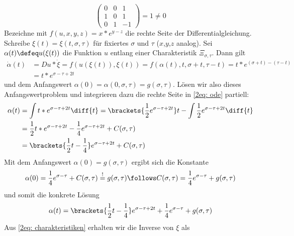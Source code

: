 \begin{exercisePage}[Charakteristikenmethode]
\begin{enumerate}[label=(zu \alph*), leftmargin=*]
\begin{equation*}
\begin{pmatrix}
				0 & 0 & 1 \\ 1 & 0 & 1 \\ 0 & 1 & -1
			\end{pmatrix}
			= 1 \neq 0
		\end{equation*}
		Bezeichne mit $f(u,x,y,z) = x * e^{y-z}$ die rechte Seite der Differentialgleichung. Schreibe $\xi(t) = \xi(t, \sigma, \tau)$ für fixiertes $\sigma$ und $\tau$ ($x$,$y$,$z$ analog). Sei $\alpha(t) \defeq u(\xi(t))$ die Funktion $u$ entlang einer Charakteristik $\Xi_{\sigma, \tau}$. Dann gilt
		\begin{equation} \label{2eq: ode}
			\begin{aligned}
				\dot{\alpha}(t) 
				&= Du * \dot{\xi} = f(u(\xi(t)), \xi(t)) = f(\alpha(t), t, \sigma + t, \tau -t) = t * e^{(\sigma + t) - (\tau - t)} \\
				&= t*e^{\sigma - \tau + 2t}
			\end{aligned}
		\end{equation}
		und dem Anfangswert $\alpha(0) = \alpha(0, \sigma, \tau) = g(\sigma, \tau)$. Lösen wir also dieses Anfangswertproblem und integrieren dazu die rechte Seite in \cref{2eq: ode} partiell:
		\begin{equation*}
			\begin{aligned}
				\alpha(t) 
				&= \int t*e^{\sigma - \tau + 2t} \diff{t} 
				= \brackets{\frac{1}{2} e^{\sigma - \tau + 2t}} t - \int \frac{1}{2} e^{\sigma - \tau + 2t} \diff{t} \\
				&= \frac{1}{2} t * e^{\sigma - \tau + 2t} - \frac{1}{4} e^{\sigma - \tau + 2t} + C(\sigma, \tau) \\
				&= \brackets{\frac{1}{2} t - \frac{1}{4}} e^{\sigma - \tau + 2t} + C(\sigma, \tau)
			\end{aligned}
		\end{equation*}
		Mit dem Anfangswert $\alpha(0) = g(\sigma, \tau)$ ergibt sich die Konstante
		\begin{equation*}
			\alpha(0) = \frac{1}{4} e^{\sigma - \tau} + C(\sigma, \tau) \overset{!}{=} g(\sigma, \tau) 
			\follows
			C(\sigma, \tau) = \frac{1}{4} e^{\sigma - \tau} + g(\sigma, \tau)
		\end{equation*}
		und somit die konkrete Lösung
		\begin{equation*}
			\alpha(t) = \brackets{\frac{1}{2} t - \frac{1}{4}} e^{\sigma - \tau + 2t} + \frac{1}{4} e^{\sigma - \tau} + g(\sigma, \tau)
		\end{equation*}
		Aus \cref{2eq: charakteristiken} erhalten wir die Inverse von $\xi$ als
		\begin{equation*}

\end{equation*}
\end{enumerate}
\end{exercisePage}
